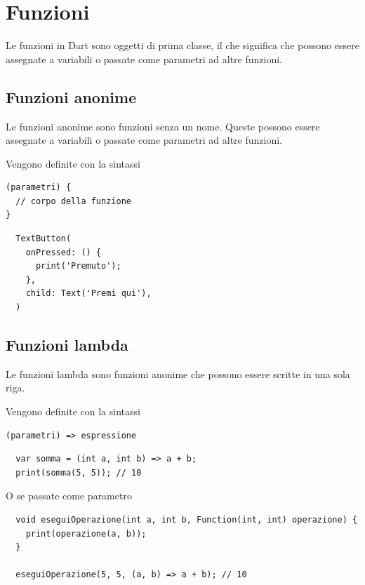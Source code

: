 \documentclass[12pt]{article}
\begin{document}
\section{Funzioni}
Le funzioni in Dart sono oggetti di prima classe, il che significa che possono essere assegnate a variabili o passate come parametri ad altre funzioni.

\subsection{Funzioni anonime}
Le funzioni anonime sono funzioni senza un nome.
Queste possono essere assegnate a variabili o passate come parametri ad altre funzioni.

Vengono definite con la sintassi
\begin{highlight}
\begin{verbatim}
(parametri) {
  // corpo della funzione
}
\end{verbatim}
\end{highlight}

\begin{verbatim}
  TextButton(
    onPressed: () {
      print('Premuto');
    },
    child: Text('Premi qui'),
  )
\end{verbatim}

\subsection{Funzioni lambda}
Le funzioni lambda sono funzioni anonime che possono essere scritte in una sola riga.

Vengono definite con la sintassi
\begin{highlight}
\begin{verbatim}
(parametri) => espressione
\end{verbatim}
\end{highlight}

\begin{verbatim}
  var somma = (int a, int b) => a + b;
  print(somma(5, 5)); // 10
\end{verbatim}
O se passate come parametro
\begin{verbatim}
  void eseguiOperazione(int a, int b, Function(int, int) operazione) {
    print(operazione(a, b));
  }

  eseguiOperazione(5, 5, (a, b) => a + b); // 10
\end{verbatim}
\end{document}
